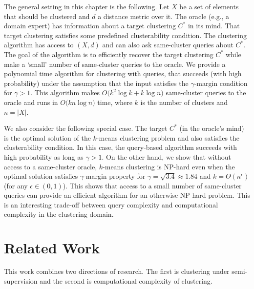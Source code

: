 \documentclass[12pt]{article}
\begin{document}
The general setting in this chapter is the following. Let $X$ be a set of elements that should be clustered and $d$ a distance metric over it. The oracle (e.g., a domain expert) has information about a target clustering $C^*$ in its mind. That target clustering satisfies some predefined clusterability condition. The clustering algorithm has access to $(X, d)$ and can also ask same-cluster queries about $C^*$. The goal of the algorithm is to efficiently recover the target clustering $C^*$ while make a `small' number of same-cluster queries to the oracle. We provide a polynomial time algorithm for clustering with queries, that succeeds (with high probability) under the assumption that the input satisfies the $\gamma$-margin condition for $\gamma > 1$. This algorithm makes $O\big(k^2\log k + k\log n)$ same-cluster queries to the oracle and runs in $O\big(kn\log n)$ time, where $k$ is the number of clusters and $n = |X|$.

We also consider the following special case. The target $C^*$ (in the oracle's mind) is the optimal solution of the $k$-means clustering problem and also satisfies the clusterability condition. In this case, the query-based algorithm succeeds with high probability as long as $\gamma >1$.  On the other hand, we show that without access to a same-cluster oracle, $k$-means clustering is NP-hard even when the optimal solution satisfies $\gamma$-margin property for $\gamma=\sqrt{3.4} \approx 1.84$ and $k=\Theta(n^\epsilon)$ (for any $\epsilon\in (0,1)$). This shows that access to a small number of same-cluster queries can provide an efficient algorithm for an otherwise NP-hard problem. This is an interesting trade-off between query complexity and computational complexity in the clustering domain. 


\section{Related Work}
This work combines two directions of research. The first is clustering under semi-supervision and the second is computational complexity of clustering. 
\end{document}
